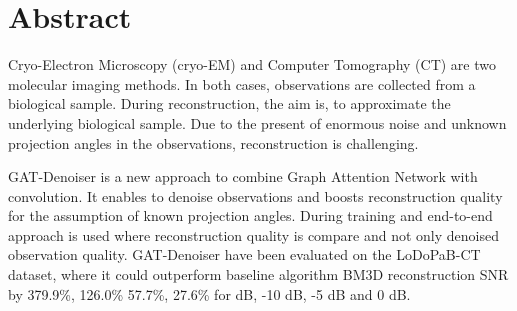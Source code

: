 \chapter{Abstract}


Cryo-Electron Microscopy (cryo-EM) and Computer Tomography (CT) 
are two molecular imaging methods.
In both cases, observations are collected from a biological sample.
During reconstruction, the aim is, to approximate
 the underlying biological sample.
 Due to the present of enormous noise and unknown projection angles 
in the observations, reconstruction is challenging.

GAT-Denoiser is a new approach to combine Graph Attention Network 
with convolution. It enables to denoise observations and boosts
reconstruction quality for the assumption of known projection angles.
During training and end-to-end approach 
is used where reconstruction quality is compare and not only
denoised observation quality.
GAT-Denoiser have been evaluated on the LoDoPaB-CT~\cite{lodopab-dataset} dataset,
where it could outperform baseline algorithm BM3D 
reconstruction SNR by 379.9\%, 126.0\% 57.7\%, 27.6\% for  dB, -10 dB, -5 dB and 0 dB. 
